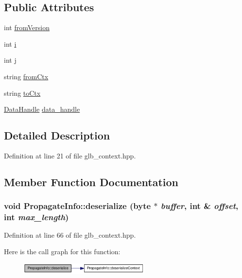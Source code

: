 \subsection*{Public Attributes}
\begin{DoxyCompactItemize}
\item 
int \hyperlink{struct_propagate_info_a397493e2b12ee4f2922f4411dc2ee75a}{fromVersion}
\item 
int \hyperlink{struct_propagate_info_a42a9fbf00adf4661b3a291915bbe4182}{i}
\item 
int \hyperlink{struct_propagate_info_ac096d4c40115dd5e9909e765ec09c4ca}{j}
\item 
string \hyperlink{struct_propagate_info_a8d941df737a95b7eae658478422ff1c4}{fromCtx}
\item 
string \hyperlink{struct_propagate_info_ae9d0d464b1bbd144e2ba1a1ebd4e0382}{toCtx}
\item 
\hyperlink{struct_data_handle}{DataHandle} \hyperlink{struct_propagate_info_abd2d16e1244a316b81e4ea55bf672078}{data\_\-handle}
\end{DoxyCompactItemize}


\subsection{Detailed Description}


Definition at line 21 of file glb\_\-context.hpp.

\subsection{Member Function Documentation}
\hypertarget{struct_propagate_info_a7dd786107e3f53d7b24d7482709a3347}{
\subsubsection[{deserialize}]{\setlength{\rightskip}{0pt plus 5cm}void PropagateInfo::deserialize ({\bf byte} $\ast$ {\em buffer}, \/  int \& {\em offset}, \/  int {\em max\_\-length})}}
\label{struct_propagate_info_a7dd786107e3f53d7b24d7482709a3347}


Definition at line 66 of file glb\_\-context.hpp.

Here is the call graph for this function:\nopagebreak
\begin{figure}[H]
\begin{center}
\leavevmode
\includegraphics[width=187pt]{struct_propagate_info_a7dd786107e3f53d7b24d7482709a3347_cgraph}
\end{center}
\end{figure}


